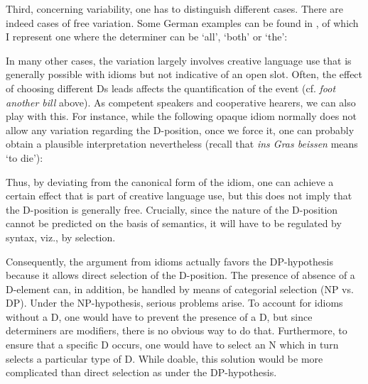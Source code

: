 \documentclass[output=paper,colorlinks,citecolor=black,
]{langscibook}
\begin{document}
   Third, concerning variability, one has to distinguish different cases. There are indeed cases of free variation. Some German examples can be found in \citet[209]{Fleischer:1982:Phraseologie}, of which I represent one where the determiner can be `all', `both' or `the':
   
   \z
   
    In many other cases, the variation largely involves creative language use that is generally possible with idioms but not indicative of an open slot. Often, the effect of choosing different Ds leads affects the quantification of the event (cf. \textit{foot another bill} above). As competent speakers and cooperative hearers, we can also play with this. For instance, while the  following opaque idiom  normally does not allow any variation regarding the D-position, once we force it, one can probably obtain a plausible interpretation nevertheless (recall that \textit{ins Gras beissen} means `to die'):
    
    \z
    
    Thus, by deviating from the canonical form of the idiom, one can achieve a certain effect that is part of creative language use, but this does not imply that the D-position is generally free. Crucially, since the nature of the D-position cannot be predicted on the basis of semantics, it will have to be regulated by syntax, viz., by selection. 
    
    Consequently, the argument from idioms actually favors the DP-hypothesis because it allows direct selection of the D-position. The presence of absence of a D-element can, in addition, be handled by means of categorial selection (NP vs. DP). Under the NP-hypothesis, serious problems arise. To account for idioms without a D, one would have to prevent the presence of a D, but since determiners are modifiers, there is no obvious way to do that. Furthermore, to ensure that a specific D occurs, one would have to select an N which in turn selects a particular type of D. While doable, this solution would be more complicated than direct selection as under the DP-hypothesis.
\end{document}
